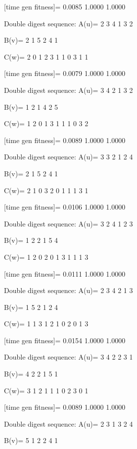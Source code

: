 [time gen fitness]=
    0.0085    1.0000    1.0000

Double digest sequence:
A(u)=
     2     3     4     1     3     2

B(v)=
     2     1     5     2     4     1

C(w)=
     2     0     1     2     3     1     1     0     3     1     1

[time gen fitness]=
    0.0079    1.0000    1.0000

Double digest sequence:
A(u)=
     3     4     2     1     3     2

B(v)=
     1     2     1     4     2     5

C(w)=
     1     2     0     1     3     1     1     1     0     3     2

[time gen fitness]=
    0.0089    1.0000    1.0000

Double digest sequence:
A(u)=
     3     3     2     1     2     4

B(v)=
     2     1     5     2     4     1

C(w)=
     2     1     0     3     2     0     1     1     1     3     1

[time gen fitness]=
    0.0106    1.0000    1.0000

Double digest sequence:
A(u)=
     3     2     4     1     2     3

B(v)=
     1     2     2     1     5     4

C(w)=
     1     2     0     2     0     1     3     1     1     1     3

[time gen fitness]=
    0.0111    1.0000    1.0000

Double digest sequence:
A(u)=
     2     3     4     2     1     3

B(v)=
     1     5     2     1     2     4

C(w)=
     1     1     3     1     2     1     0     2     0     1     3

[time gen fitness]=
    0.0154    1.0000    1.0000

Double digest sequence:
A(u)=
     3     4     2     2     3     1

B(v)=
     4     2     2     1     5     1

C(w)=
     3     1     2     1     1     1     0     2     3     0     1

[time gen fitness]=
    0.0089    1.0000    1.0000

Double digest sequence:
A(u)=
     2     3     1     3     2     4

B(v)=
     5     1     2     2     4     1

